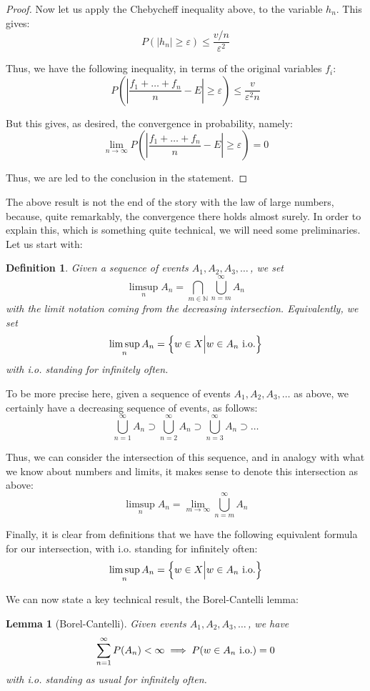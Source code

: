 \documentclass[12pt]{amsbook}
\newtheorem{definition}[theorem]{Definition}
\newtheorem{lemma}[theorem]{Lemma}
\begin{document}
\begin{proof}
Now let us apply the Chebycheff inequality above, to the variable $h_n$. This gives:
$$P(|h_n|\geq\varepsilon)\leq\frac{v/n}{\varepsilon^2}$$

Thus, we have the following inequality, in terms of the original variables $f_i$:
$$P\left(\left|\frac{f_1+\ldots+f_n}{n}-E\right|\geq\varepsilon\right)\leq\frac{v}{\varepsilon^2 n}$$

But this gives, as desired, the convergence in probability, namely:
$$\lim_{n\to\infty}P\left(\left|\frac{f_1+\ldots+f_n}{n}-E\right|\geq\varepsilon\right)=0$$

Thus, we are led to the conclusion in the statement.
\end{proof}

The above result is not the end of the story with the law of large numbers, because, quite remarkably, the convergence there holds almost surely. In order to explain this, which is something quite technical, we will need some preliminaries. Let us start with:


\begin{definition}
Given a sequence of events $A_1,A_2,A_3,\ldots\,$, we set
$$\limsup_nA_n=\bigcap_{m\in\mathbb N}\bigcup_{n=m}^\infty A_n$$
with the limit notation coming from the decreasing intersection. Equivalently, we set
$$\limsup_nA_n=\left\{w\in X\Big|w\in A_n\ {\rm i.o.}\right\}$$
with i.o. standing for infinitely often.
\end{definition}

To be more precise here, given a sequence of events $A_1,A_2,A_3,\ldots$ as above, we certainly have a decreasing sequence of events, as follows:
$$\bigcup_{n=1}^\infty A_n\supset\bigcup_{n=2}^\infty A_n\supset\bigcup_{n=3}^\infty A_n\supset\ldots$$

Thus, we can consider the intersection of this sequence, and in analogy with what we know about numbers and limits, it makes sense to denote this intersection as above: 
$$\limsup_nA_n=\lim_{m\to\infty}\bigcup_{n=m}^\infty A_n$$

Finally, it is clear from definitions that we have the following equivalent formula for our intersection, with i.o. standing for infinitely often:
$$\limsup_nA_n=\left\{w\in X\Big|w\in A_n\ {\rm i.o.}\right\}$$

We can now state a key technical result, the Borel-Cantelli lemma:


\begin{lemma}[Borel-Cantelli]
Given events $A_1,A_2,A_3,\ldots\,$, we have
$$\sum_{n=1}^\infty P(A_n)<\infty\implies P(w\in A_n\ {\rm i.o.})=0$$
with i.o. standing as usual for infinitely often.
\end{lemma}
\end{document}
